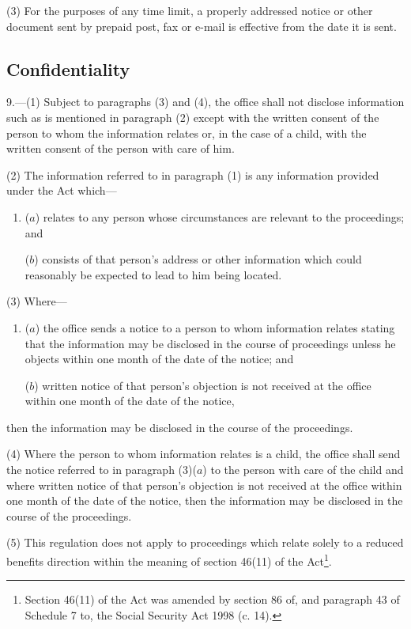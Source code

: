 \documentclass[12pt,a4paper]{article}
\begin{document}
(3) For the purposes of any time limit, a properly addressed notice or other document sent by prepaid post, fax or e-mail is effective from the date it is sent.

\subsection[9. Confidentiality]{Confidentiality}

9.—(1) Subject to paragraphs (3) and (4), the office shall not disclose information such as is mentioned in paragraph (2) except with the written consent of the person to whom the information relates or, in the case of a child, with the written consent of the person with care of him.

(2) The information referred to in paragraph (1) is any information provided under the Act which---
\begin{enumerate}\item[]
($a$) relates to any person whose circumstances are relevant to the proceedings; and

($b$) consists of that person’s address or other information which could reasonably be expected to lead to him being located.
\end{enumerate}

(3) Where---
\begin{enumerate}\item[]
($a$) the office sends a notice to a person to whom information relates stating that the information may be disclosed in the course of proceedings unless he objects within one month of the date of the notice; and

($b$) written notice of that person’s objection is not received at the office within one month of the date of the notice,
\end{enumerate}
then the information may be disclosed in the course of the proceedings.

(4) Where the person to whom information relates is a child, the office shall send the notice referred to in paragraph (3)($a$) to the person with care of the child and where written notice of that person’s objection is not received at the office within one month of the date of the notice, then the information may be disclosed in the course of the proceedings.

(5) This regulation does not apply to proceedings which relate solely to a reduced benefits direction within the meaning of section 46(11) of the Act\footnote{\frenchspacing Section 46(11) of the Act was amended by section 86 of, and paragraph 43 of Schedule 7 to, the Social Security Act 1998 (c. 14).}.
\end{document}
